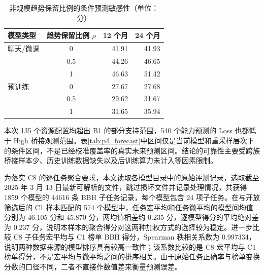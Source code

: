\documentclass[bwprint]{gmcmthesis}
\numberwithin{equation}{section}
\numberwithin{figure}{section}
\numberwithin{table}{section}
\begin{document}
        \begin{table}[H]
        \centering
        \caption{非规模趋势保留比例的条件预测敏感性（单位：分）}
        \label{tab:p4_retention_sensitivity}
        \begin{tabular}{lcrr}
        \toprule
        模型类型 & 趋势保留比例 $\rho$ & 12 个月 & 24 个月 \\
        \midrule
        聊天/微调 & 0 & 41.91 & 41.93 \\
                  & 0.5 & 44.26 & 46.65 \\
                  & 1 & 46.63 & 51.42 \\
        \midrule
        预训练    & 0 & 27.67 & 27.68 \\
                  & 0.5 & 29.62 & 31.67 \\
                  & 1 & 31.65 & 35.94 \\
        \bottomrule
        \end{tabular}
        \end{table}

        本次 135 个资源配置均超出 B1 的部分支持范围，540 个能力预测的 Loss 也都低于 High 桥接观测范围。表\ref{tab:p4_forecast}中区间仅是当前模型和重采样层次下的条件区间，不是已经校准覆盖率的真实未来预测区间。结论的可靠性主要受跨族桥接样本少、历史训练数据缺失以及后训练算力未计入等因素限制。

        为落实 C8 的逐任务聚合要求，本文读取各模型目录中的原始评测记录，选取截至 2025 年 3 月 13 日最新可解析的文件，跳过损坏文件并记录处理情况，共获得 1859 个模型的 44616 条 BBH 子任务记录，每个模型包含 24 项子任务。在与开放筛选后的 C1 样本匹配的 574 个模型中，任务宏平均和任务微平均的模型间均值分别为 46.105 分和 45.870 分，两均值相差约 0.235 分，逐模型得分的平均绝对差为 0.237 分，说明本样本的聚合得分对这两种加权方式的选择较为稳定。进一步比较 C8 子任务宏平均与 C1 榜单 BBH 得分，Spearman 秩相关系数为 0.997334，说明两种数据来源的模型排序具有较高一致性；该系数比较的是 C8 宏平均与 C1 榜单得分，不是宏平均与微平均之间的排序相关。由于原始任务正确率与榜单变换分数的口径不同，二者不直接作数值差来衡量预测误差。
\end{document}
